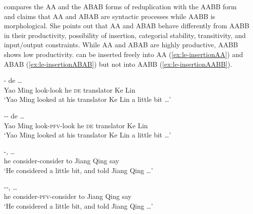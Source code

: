 \citet{Xie2020} compares the AA and the ABAB forms of reduplication with the AABB form and claims that AA and ABAB are syntactic processes while AABB is morphological.
She points out that AA and ABAB behave differently from AABB in their productivity, possibility of  insertion, categorial stability, transitivity, and input/output constraints.
While AA and ABAB are highly productive, AABB shows low productivity. 
 can be inserted freely into AA (\ref{ex:le-insertionAA}) and ABAB (\ref{ex:le-insertionABAB}) but not into AABB (\ref{ex:le-insertionAABB}).

\settowidth{}

\ea\label{ex:le-insertionAA}
  \ea \gll {}  -  de    \ldots\\
  Yao Ming look-look he \textsc{de} translator Ke Lin\\
  \glt `Yao Ming looked at his translator Ke Lin a little bit \ldots'
  
  \ex \gll {}  --  de    \ldots\\
  Yao Ming look-\textsc{pfv}-look he \textsc{de} translator Ke Lin\\ 
  \glt `Yao Ming looked at his translator Ke Lin a little bit \ldots'
  \z
\z

\ea\label{ex:le-insertionABAB}
  \ea \gll {} -,     \ldots\\
  he consider-consider to Jiang Qing say\\
 \glt `He considered a little bit, and told Jiang Qing \ldots'
 
  \ex \gll {} --,     \ldots\\
  he consider-\textsc{pfv}-consider to Jiang Qing say\\ 
  \glt `He considered a little bit, and told Jiang Qing \ldots'
  \z
\z

\ea\label{ex:le-insertionAABB}
  
